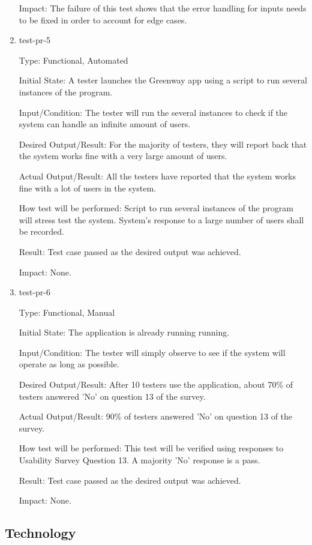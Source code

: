 \documentclass[12pt, titlepage]{article}
\begin{document}
\begin{enumerate}
Impact: The failure of this test shows that the error handling for inputs needs to be fixed in order to account for edge cases.

\item{test-pr-5\\}

Type: Functional, Automated

Initial State: A tester launches the Greenway app using a script to run several instances of the program.

Input/Condition: The tester will run the several instances to check if the system can handle an infinite amount of users.

Desired Output/Result: For the majority of testers, they will report back that the system works fine with a very large amount of users.

Actual Output/Result: All the testers have reported that the system works fine with a lot of users in the system.

How test will be performed: Script to run several instances of the program will stress test the system. System's response to a large number of users shall be recorded. 

Result: Test case passed as the desired output was achieved.

Impact: None.

\item{test-pr-6\\}

Type: Functional, Manual

Initial State: The application is already running running. 

Input/Condition: The tester will simply observe to see if the system will operate as long as possible.

Desired Output/Result: After 10 testers use the application, about 70\% of testers answered 'No' on question 13 of the survey.

Actual Output/Result: 90\% of testers answered 'No' on question 13 of the survey.

How test will be performed: This test will be verified using responses to Usability Survey Question 13. A majority 'No' response is a pass.

Result: Test case passed as the desired output was achieved.

Impact: None.

\end{enumerate}


\subsection{Technology}
\end{document}
